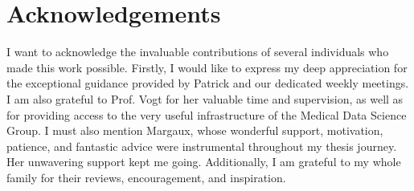 \section*{Acknowledgements}
I want to acknowledge the invaluable contributions of several individuals who made this work possible. Firstly, I would like to express my deep appreciation for the exceptional guidance provided by Patrick and our dedicated weekly meetings. I am also grateful to Prof. Vogt for her valuable time and supervision, as well as for providing access to the very useful infrastructure of the Medical Data Science Group. I must also mention Margaux, whose wonderful support, motivation, patience, and fantastic advice were instrumental throughout my thesis journey. Her unwavering support kept me going. Additionally, I am grateful to my whole family for their reviews, encouragement, and inspiration.
